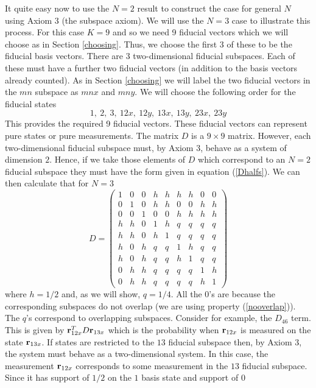 \documentclass[10pt,twocolumn]{article}
\begin{document}
It quite easy now to use the $N=2$ result to construct the case for
general $N$ using Axiom 3 (the subspace axiom).  We will use the
$N=3$ case to illustrate this process.  For this case $K=9$ and so we
need 9 fiducial vectors which we will choose as in Section
\ref{choosing}.  Thus, we choose the first 3 of these
to be the fiducial basis vectors.
There are 3 two-dimensional fiducial
subspaces.  Each of these must have a further two fiducial vectors (in
addition to the basis vectors already counted).  As in Section
\ref{choosing} we will label the two
fiducial vectors in the $mn$ subspace as $mnx$ and $mny$.
We will choose the following order for the fiducial states
\[ 1,~ 2,~ 3,~ 12x,~ 12y,~ 13x,~ 13y,~ 23x,~ 23y    \]
This provides the required 9 fiducial vectors. These fiducial vectors
can represent pure states or pure measurements.  The matrix $D$ is a
$9\times 9$ matrix.  However, each two-dimensional fiducial subspace must, by
Axiom 3, behave as a system of dimension $2$.  Hence, if we take those
elements of $D$ which correspond to an $N=2$ fiducial subspace they must
have the form given in equation (\ref{Dhalfs}).  We can then calculate
that for $N=3$
\[ D= \left( \begin{array}{ccccccccc}
1 & 0 & 0 & h & h & h & h & 0 & 0 \\
0 & 1 & 0 & h & h & 0 & 0 & h & h \\
0 & 0 & 1 & 0 & 0 & h & h & h & h \\
h & h & 0 & 1 & h & q & q & q & q \\
h & h & 0 & h & 1 & q & q & q & q \\
h & 0 & h & q & q & 1 & h & q & q \\
h & 0 & h & q & q & h & 1 & q & q \\
0 & h & h & q & q & q & q & 1 & h \\
0 & h & h & q & q & q & q & h & 1
\end{array}\right)  \]
where $h=1/2$ and, as we will show, $q=1/4$.  All the 0's are because
the corresponding subspaces do not overlap (we are using property
(\ref{nooverlap})).  The $q$'s correspond to
overlapping subspaces.  Consider for example, the $D_{46}$ term.  This
is given by ${\bf r}_{12x}^T D {\bf r}_{13x}$ which is the probability
when ${\bf r}_{12x}$ is measured on the state ${\bf r}_{13x}$.  If
states are restricted to the $13$ fiducial subspace then, by Axiom 3,
the system must
behave as a two-dimensional system.  In this case, the measurement ${\bf
r}_{12x}$ corresponds to some measurement in the $13$ fiducial subspace.
Since it has support of $1/2$ on the $1$ basis state and support of $0$
\end{document}

